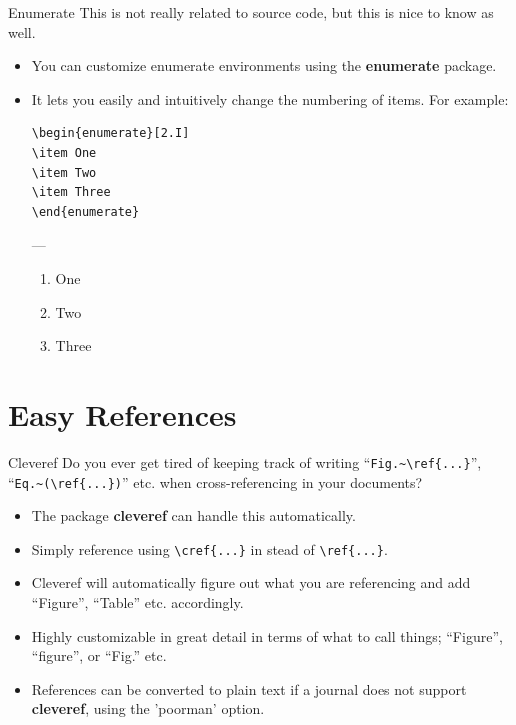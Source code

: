 \documentclass[english]{beamer}
\begin{document}
\begin{frame}[fragile]{\insertsection}{Enumerate}
  This is not really related to source code, but this is nice to know
  as well.
  \begin{itemize}
  \item You can customize enumerate environments using the
    \textbf{enumerate} package.
  \item It lets you easily and intuitively change the numbering of
    items. For example:
\begin{verbatim}
\begin{enumerate}[2.I]
\item One
\item Two
\item Three
\end{enumerate}
\end{verbatim}
    ---

    \begin{enumerate}[2.I]
    \item One
    \item Two
    \item Three
    \end{enumerate}
  \end{itemize}
\end{frame}


\section{Easy References}

\begin{frame}[fragile]{\insertsection}{Cleveref}
  Do you ever get tired of keeping track of writing
  ``\verb|Fig.~\ref{...}|'', ``\verb|Eq.~(\ref{...})|'' etc. when
  cross-referencing in your documents?
  \begin{itemize}
  \item The package \textbf{cleveref} can handle this automatically.
  \item Simply reference using \verb|\cref{...}| in stead of \verb|\ref{...}|.
  \item Cleveref will automatically figure out what you are
    referencing and add ``Figure'', ``Table'' etc. accordingly.
  \item Highly customizable in great detail in terms of what to call
    things; ``Figure'', ``figure'', or ``Fig.'' etc.
  \item References can be converted to plain text if a journal does
    not support \textbf{cleveref}, using the 'poorman' option.
  \end{itemize}
\end{frame}
\end{document}
